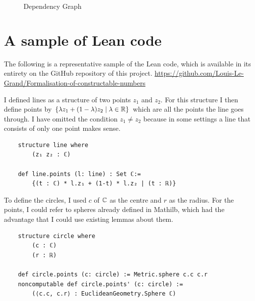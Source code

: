 \clearpage
\begin{figure}[h]
    \centering
    \label{fig:DependencyGraph}
    \caption{Dependency Graph}
\end{figure}
\clearpage
\section{A sample of Lean code} 
The following is a representative sample of the Lean code, which is available in its entirety on the GitHub repository of this project. 
\url{https://github.com/Louis-Le-Grand/Formalisation-of-constructable-numbers}

I defined lines as a structure of two points $z_1$ and $z_2$. 
For this structure I then define points by $\{\lambda z_1 + (1-\lambda)z_2\mid\lambda\in\mathbb{R}\}$ which are all the points the line goes through. 
I have omitted the condition $z_1\ne z_2$ because in some settings a line that consists of only one point makes sense.
\begin{lstlisting}
    structure line where
        (z₁ z₂ : ℂ)

    def line.points (l: line) : Set ℂ:= 
        {(t : ℂ) * l.z₁ + (1-t) * l.z₂ | (t : ℝ)}
\end{lstlisting}

To define the circles, I used $c$ of $\mathbb{C}$ as the centre and $r$ as the radius. 
For the points, I could refer to spheres already defined in Mathilb, which had the advantage that I could use existing lemmas about them. 
\begin{lstlisting}
    structure circle where
        (c : ℂ)
        (r : ℝ)

    def circle.points (c: circle) := Metric.sphere c.c c.r
    noncomputable def circle.points' (c: circle) := 
        (⟨c.c, c.r⟩ : EuclideanGeometry.Sphere ℂ)
\end{lstlisting}

